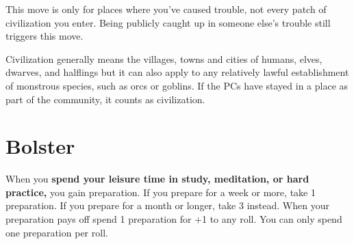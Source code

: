 This move is only for places where you've caused trouble, not every patch of civilization you enter. Being publicly caught up in someone else's trouble still triggers this move.


 Civilization generally means the villages, towns and cities of humans, elves, dwarves, and halflings but it can also apply to any relatively lawful establishment of monstrous species, such as orcs or goblins. If the PCs have stayed in a place as part of the community, it counts as civilization.
\section{Bolster}


 When you \textbf{spend your leisure time in study, meditation, or hard practice,}
 you gain preparation. If you prepare for a week or more, take 1 preparation. If you prepare for a month or longer, take 3 instead. When your preparation pays off spend 1 preparation for +1 to any roll. You can only spend one preparation per roll.



